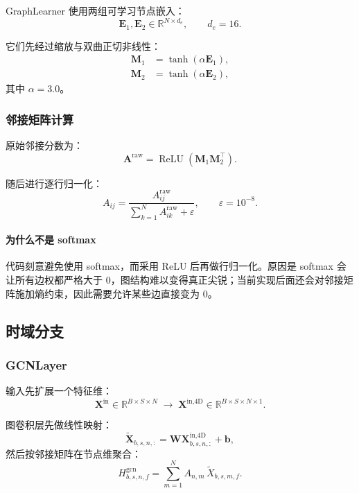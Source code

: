 \documentclass[UTF8]{ctexart}
\begin{document}
GraphLearner 使用两组可学习节点嵌入：
\begin{equation}
    \bm{E}_1, \bm{E}_2 \in \mathbb{R}^{N \times d_e}, \qquad d_e = 16.
\end{equation}

它们先经过缩放与双曲正切非线性：
\begin{align}
    \bm{M}_1 &= \tanh(\alpha \bm{E}_1), \\
    \bm{M}_2 &= \tanh(\alpha \bm{E}_2),
\end{align}
其中 $\alpha = 3.0$。

\subsubsection{邻接矩阵计算}

原始邻接分数为：
\begin{equation}
    \bm{A}^{\text{raw}} = \operatorname{ReLU}(\bm{M}_1 \bm{M}_2^\top).
\end{equation}

随后进行逐行归一化：
\begin{equation}
    A_{ij} = \frac{A^{\text{raw}}_{ij}}{\sum_{k=1}^{N}A^{\text{raw}}_{ik} + \varepsilon},
    \qquad \varepsilon = 10^{-8}.
\end{equation}

\paragraph{为什么不是 softmax}
代码刻意避免使用 softmax，而采用 ReLU 后再做行归一化。原因是 softmax 会让所有边权都严格大于 0，图结构难以变得真正尖锐；当前实现后面还会对邻接矩阵施加熵约束，因此需要允许某些边直接变为 0。

\subsection{时域分支}

\subsubsection{GCNLayer}

输入先扩展一个特征维：
\begin{equation}
    \bm{X}^{\text{in}} \in \mathbb{R}^{B \times S \times N}
    \;\longrightarrow\;
    \bm{X}^{\text{in,4D}} \in \mathbb{R}^{B \times S \times N \times 1}.
\end{equation}

图卷积层先做线性映射：
\begin{equation}
    \tilde{\bm{X}}_{b,s,n,:} = \bm{W}\bm{X}^{\text{in,4D}}_{b,s,n,:} + \bm{b},
\end{equation}
然后按邻接矩阵在节点维聚合：
\begin{equation}
    H^{\text{gcn}}_{b,s,n,f}
    =
    \sum_{m=1}^{N} A_{n,m}\,\tilde{X}_{b,s,m,f}.
\end{equation}
\end{document}
